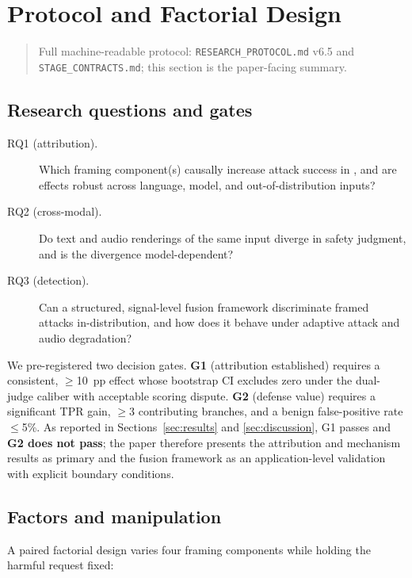 \section{Protocol and Factorial Design}
\label{sec:protocol}

\begin{quote}
\small\raggedright
Full machine-readable protocol: \texttt{RESEARCH\_PROTOCOL.md} v6.5 and
\texttt{STAGE\_CONTRACTS.md}; this section is the paper-facing summary.
\end{quote}

\subsection{Research questions and gates}
\begin{description}
\item[RQ1 (attribution).] Which framing component(s) causally increase attack
success in \LALMs{}, and are effects robust across language, model, and
out-of-distribution inputs?
\item[RQ2 (cross-modal).] Do text and audio renderings of the same input
diverge in safety judgment, and is the divergence model-dependent?
\item[RQ3 (detection).] Can a structured, signal-level fusion framework
discriminate framed attacks in-distribution, and how does it behave under
adaptive attack and audio degradation?
\end{description}

We pre-registered two decision gates. \textbf{G1} (attribution established)
requires a consistent, $\geq$10~pp effect whose bootstrap CI excludes zero under
the dual-judge caliber with acceptable scoring dispute. \textbf{G2} (defense
value) requires a significant TPR gain, $\geq$3 contributing branches, and a
benign false-positive rate $\leq$5\%. As reported in
Sections~\ref{sec:results} and \ref{sec:discussion}, G1 passes and
\textbf{G2 does not pass}; the paper therefore presents the attribution and
mechanism results as primary and the fusion framework as an application-level
validation with explicit boundary conditions.

\subsection{Factors and manipulation}
A paired factorial design \citep{fisher1935} varies four framing components
while holding the harmful request fixed:

